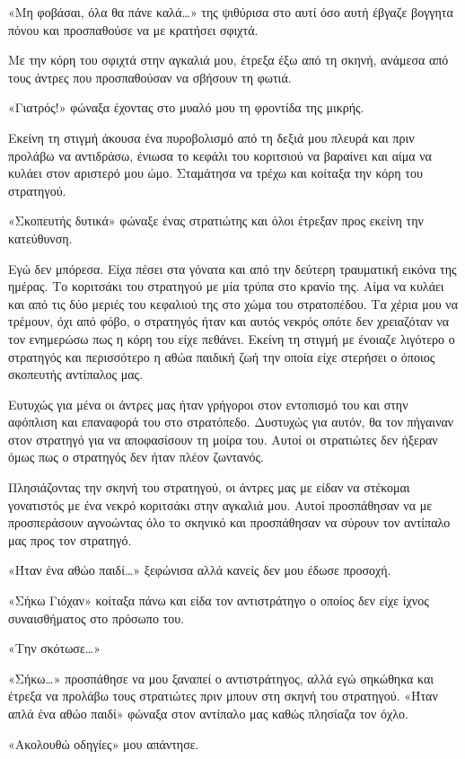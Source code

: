 \documentclass[12pt,twoside, openany]{book}
\begin{document}
«Μη φοβάσαι, όλα θα πάνε καλά…» της ψιθύρισα στο αυτί όσο αυτή έβγαζε βογγητα πόνου και προσπαθούσε να με κρατήσει σφιχτά.

Με την κόρη του σφιχτά στην αγκαλιά μου, έτρεξα έξω από τη σκηνή, ανάμεσα από τους άντρες που προσπαθούσαν να σβήσουν τη φωτιά. 

«Γιατρός!» φώναξα έχοντας στο μυαλό μου τη φροντίδα της μικρής. 

Εκείνη τη στιγμή άκουσα ένα πυροβολισμό από τη δεξιά μου πλευρά και πριν προλάβω να αντιδράσω, ένιωσα το κεφάλι του κοριτσιού να βαραίνει και αίμα να κυλάει στον αριστερό μου ώμο. Σταμάτησα να τρέχω και κοίταξα την κόρη του στρατηγού.

«Σκοπευτής δυτικά» φώναξε ένας στρατιώτης και όλοι έτρεξαν προς εκείνη την κατεύθυνση.

Εγώ δεν μπόρεσα. Είχα πέσει στα γόνατα και από την δεύτερη τραυματική εικόνα της ημέρας.  Το κοριτσάκι του στρατηγού με μία τρύπα στο κρανίο της. Αίμα να κυλάει και από τις δύο μεριές του κεφαλιού της στο χώμα του στρατοπέδου. Τα χέρια μου να τρέμουν, όχι από φόβο, ο στρατηγός ήταν και αυτός νεκρός οπότε δεν χρειαζόταν να τον ενημερώσω πως η κόρη του είχε πεθάνει. Εκείνη τη στιγμή με ένοιαζε λιγότερο ο στρατηγός και περισσότερο η αθώα παιδική ζωή την οποία είχε στερήσει ο όποιος σκοπευτής αντίπαλος μας.

Ευτυχώς για μένα οι άντρες μας ήταν γρήγοροι στον εντοπισμό του και στην αφόπλιση και επαναφορά του στο στρατόπεδο. Δυστυχώς για αυτόν, θα τον πήγαιναν στον στρατηγό για να αποφασίσουν τη μοίρα του. Αυτοί οι στρατιώτες δεν ήξεραν όμως πως ο στρατηγός δεν ήταν πλέον ζωντανός. 

Πλησιάζοντας την σκηνή του στρατηγού, οι άντρες μας με είδαν να στέκομαι γονατιστός με ένα νεκρό κοριτσάκι στην αγκαλιά μου. Αυτοί προσπάθησαν να με προσπεράσουν αγνοώντας όλο το σκηνικό και προσπάθησαν να σύρουν τον αντίπαλο μας προς τον στρατηγό.

«Ήταν ένα αθώο παιδί…» ξεφώνισα αλλά κανείς δεν μου έδωσε προσοχή.

«Σήκω Γιόχαν» κοίταξα πάνω και είδα τον αντιστράτηγο ο οποίος δεν είχε ίχνος συναισθήματος στο πρόσωπο του.

«Την σκότωσε…»

«Σήκω…» προσπάθησε να μου ξαναπεί ο αντιστράτηγος, αλλά εγώ σηκώθηκα και έτρεξα να προλάβω τους στρατιώτες πριν μπουν στη σκηνή του στρατηγού. «Ήταν απλά ένα αθώο παιδί» φώναξα στον αντίπαλο μας καθώς πλησίαζα τον όχλο.

«Ακολουθώ οδηγίες» μου απάντησε.
\end{document}
